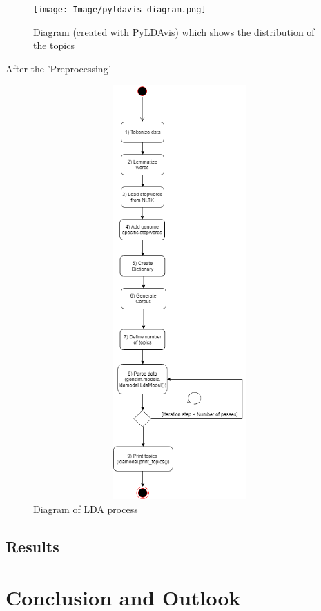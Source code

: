 \begin{figure}[htbp]
	\centering
	\texttt{[image: Image/pyldavis\_diagram.png]}
	\caption{Diagram (created with PyLDAvis) which shows the distribution of the topics}
	\label{pyldavis_diagram}
\end{figure}

After the 'Preprocessing'

\begin{figure}[htbp]
	\centering
	\includegraphics[width=1\textwidth, height=600px, keepaspectratio]{Image/LDA_central_process.png}
	\caption{Diagram of LDA process}
	\label{LDA_central_process_figure}
\end{figure}

\section{Results}\label{results}


\chapter{Conclusion and Outlook}\label{conclusion_outlook}
